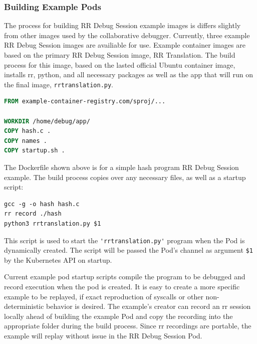 \documentclass[12pt]{article}
\begin{document}
\subsubsection{Building Example Pods} \label{buildingchannel}

The process for building RR Debug Session example images is differs
slightly from other images used by the collaborative debugger.
Currently, three example RR Debug Session images are availiable for
use.  Example container images are based on the primary RR Debug
Session image, RR Translation.  The build process for this image,
based on the lasted official Ubuntu container image, installs rr,
python, and all necessary packages as well as the app that will run on
the final image, \lstinline{rrtranslation.py}.

\begin{lstlisting}[language=Dockerfile,basicstyle=\linespread{0.5}\ttfamily,caption={RR Debug Session Hash Example---Dockerfile},captionpos=b]
FROM example-container-registry.com/sproj/...
  
WORKDIR /home/debug/app/
COPY hash.c .
COPY names .
COPY startup.sh .
\end{lstlisting}

The Dockerfile shown above is for a simple hash program RR Debug
Session example.  The build process copies over any necessary files,
as well as a startup script:

\begin{lstlisting}[basicstyle=\linespread{0.5}\ttfamily,caption={Example Startup Script},captionpos=b]
gcc -g -o hash hash.c
rr record ./hash
python3 rrtranslation.py $1
\end{lstlisting}

This script is used to start the \lstinline{'rrtranslation.py'} program
when the Pod is dynamically created.  The script will be passed the
Pod's channel as argument \lstinline{$1} by the Kubernetes API on
startup.
\par

Current example pod startup scripts compile the program to be debugged
and record execution when the pod is created.  It is easy to create a
more specific example to be replayed, if exact reproduction of
syscalls or other non-deterministic behavior is desired.  The
example's creator can record an rr session locally ahead of building
the example Pod and copy the recording into the appropriate folder
during the build process.  Since rr recordings are portable, the
example will replay without issue in the RR Debug Session Pod.
\end{document}
